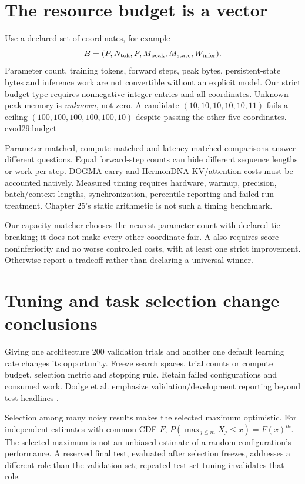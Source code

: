 \section{The resource budget is a vector}
Use a declared set of coordinates, for example
\[
 B=(P,N_{\rm tok},F,M_{\rm peak},M_{\rm state},W_{\rm infer}).
\]
Parameter count, training tokens, forward steps, peak bytes, persistent-state bytes
and inference work are not convertible without an explicit model.
Our strict budget type requires nonnegative integer entries and all coordinates.
Unknown peak memory is \emph{unknown}, not zero.
A candidate $(10,10,10,10,10,11)$ fails a ceiling
$(100,100,100,100,100,10)$ despite passing the other five coordinates.
{evod29:budget}

Parameter-matched, compute-matched and latency-matched comparisons answer different
questions. Equal forward-step counts can hide different sequence lengths or work per
step. DOGMA carry and HermonDNA KV/attention costs must be accounted natively.
Measured timing requires hardware, warmup, precision, batch/context lengths,
synchronization, percentile reporting and failed-run treatment.
Chapter 25's static arithmetic is not such a timing benchmark.

Our capacity matcher chooses the nearest parameter count with declared tie-breaking;
it does not make every other coordinate fair. A  also
requires score noninferiority and no worse controlled costs, with at least one
strict improvement. Otherwise report a tradeoff rather than declaring a universal
winner.

\section{Tuning and task selection change conclusions}
Giving one architecture 200 validation trials and another one default learning rate
changes its opportunity. Freeze search spaces, trial counts or compute budget,
selection metric and stopping rule. Retain failed configurations and consumed work.
Dodge et al. emphasize validation/development reporting beyond test headlines
\cite{evod29:reporting}.

Selection among many noisy results makes the selected maximum optimistic. For
independent estimates with common CDF $F$, $P(\max_{j\leq m}X_j\leq x)=F(x)^m$.
The selected maximum is not an unbiased estimate of a random configuration's
performance. A reserved final test, evaluated after selection freezes, addresses a
different role than the validation set; repeated test-set tuning invalidates that role.


